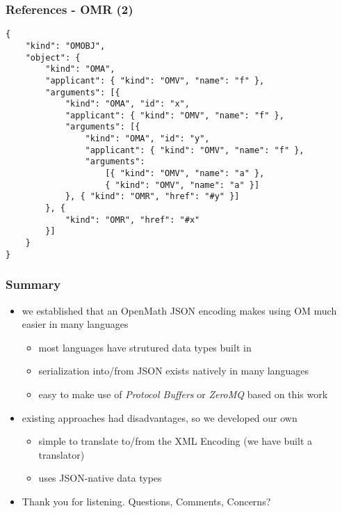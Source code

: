 \documentclass[usenames,dvipsnames]{beamer}
\begin{document}
\begin{frame}[fragile]
    \frametitle{References - OMR (2)}
\begin{lstlisting}
{
    "kind": "OMOBJ",
    "object": {
        "kind": "OMA",
        "applicant": { "kind": "OMV", "name": "f" },
        "arguments": [{ 
            "kind": "OMA", "id": "x",
            "applicant": { "kind": "OMV", "name": "f" },
            "arguments": [{
                "kind": "OMA", "id": "y",
                "applicant": { "kind": "OMV", "name": "f" },
                "arguments": 
                    [{ "kind": "OMV", "name": "a" },
                    { "kind": "OMV", "name": "a" }]
            }, { "kind": "OMR", "href": "#y" }]
        }, {
            "kind": "OMR", "href": "#x" 
        }]
    }
}
\end{lstlisting}
\end{frame}



\begin{frame}
    \frametitle{Summary}
    \begin{itemize}
        \item we established that an OpenMath JSON encoding makes using OM much easier in many languages
        \begin{itemize}
            \item most languages have strutured data types built in
            \item serialization into/from JSON exists natively in many languages
            \item easy to make use of \textit{Protocol Buffers} or \textit{ZeroMQ} based on this work
        \end{itemize}
        \item existing approaches had disadvantages, so we developed our own
        \begin{itemize}
            \item simple to translate to/from the XML Encoding (we have built a translator)
            \item uses JSON-native data types
        \end{itemize}
        \item Thank you for listening. Questions, Comments, Concerns?
    \end{itemize}
\end{frame}
\end{document}
